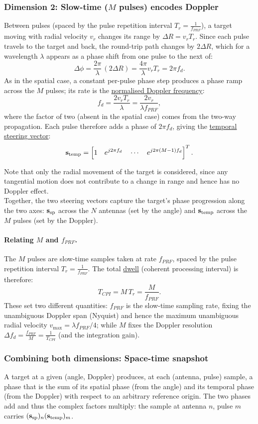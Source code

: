 \documentclass{article}
\begin{document}
\subsubsection{Dimension 2: Slow-time ($M$ pulses) encodes Doppler}
Between pulses (spaced by the pulse repetition interval $T_r = \frac{1}{f_{PRF}}$), a
target moving with radial velocity $v_r$ changes its range by
$\Delta R = v_r T_r$. Since each pulse travels to the target and back,
the round-trip path changes by $2\Delta R$, which for a wavelength $\lambda$
appears as a phase shift from one pulse to the next of:
$$\Delta\phi = \frac{2\pi}{\lambda}\,(2\Delta R)
             = \frac{4\pi}{\lambda}v_r T_r = 2\pi f_d.$$
As in the spatial case, a constant per-pulse phase step produces a phase ramp
across the $M$ pulses; its rate is the \underline{normalised Doppler frequency}:
$$f_d = \frac{2 v_r T_r}{\lambda} = \frac{2 v_r}{\lambda f_{PRF}},$$
where the factor of two (absent in the spatial case) comes from the two-way
propagation. Each pulse therefore adds a phase of $2\pi f_d$, giving the
\underline{temporal steering vector}:
$$\vb s_\text{temp} = \left[1 \quad e^{j2\pi f_d} \quad \cdots \quad
   e^{j2\pi(M-1)f_d}\right]^T.$$

Note that only the radial movement of the target is considered, since any tangential motion does not contribute to a change in range and hence has no Doppler effect.\\

Together, the two steering vectors capture the target's phase progression along the two axes: $\vb s_\text{sp}$ across the $N$ antennas (set by the angle) and $\vb s_\text{temp}$ across the $M$ pulses (set by the Doppler).

\paragraph{Relating $M$ and $f_{PRF}$.}
The $M$ pulses are slow-time samples taken at rate $f_{PRF}$, spaced by the
pulse repetition interval $T_r = \frac{1}{f_{PRF}}$. The total \underline{dwell} (coherent
processing interval) is therefore:
$$T_{CPI} = M\,T_r = \frac{M}{f_{PRF}}.$$
These set two different quantities: $f_{PRF}$ is the slow-time sampling rate,
fixing the unambiguous Doppler span (Nyquist) and hence the maximum
unambiguous radial velocity $v_{\max} = \lambda f_{PRF}/4$; while $M$ fixes the
Doppler resolution $\Delta f_d = \frac{f_{PRF}}{M} = \frac{1}{T_{CPI}}$ (and the integration gain).

\subsubsection{Combining both dimensions: Space-time snapshot}
A target at a given (angle, Doppler) produces, at each (antenna, pulse) sample, a phase that is the sum of its spatial phase (from the angle) and its temporal phase (from the Doppler) with respect to an arbitrary reference origin. The two phases add and thus the complex factors multiply: the sample at antenna $n$, pulse $m$ carries $(\vb s_\text{sp})_n(\vb s_\text{temp})_m$.\\
\end{document}
